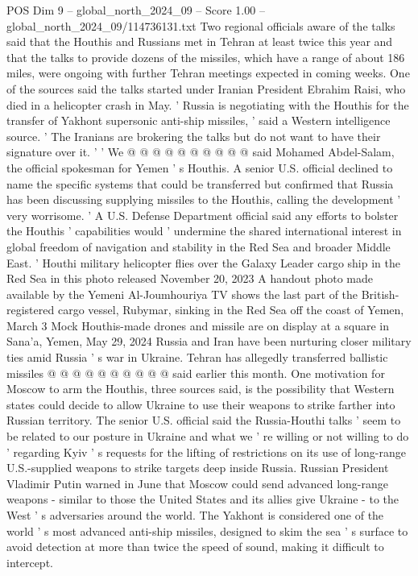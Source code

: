\begin{textsample}{POS Dim 9 – global\_north\_2024\_09 – Score 1.00 – global\_north\_2024\_09/114736131.txt}
Two regional officials aware of the talks said that the Houthis and Russians met in Tehran at least twice this year and that the talks to provide dozens of the missiles, which have a range of about 186 miles, were ongoing with further Tehran meetings expected in coming weeks.
One of the sources said the talks started under Iranian President Ebrahim Raisi, who died in a helicopter crash in May. ' Russia is negotiating with the Houthis for the transfer of Yakhont supersonic anti-ship missiles, ' said a Western intelligence source. ' The Iranians are brokering the talks but do not want to have their signature over it. ' ' We @ @ @ @ @ @ @ @ @ @ said Mohamed Abdel-Salam, the official spokesman for Yemen ' s Houthis.
A senior U.S. official declined to name the specific systems that could be transferred but confirmed that Russia has been discussing supplying missiles to the Houthis, calling the development ' very worrisome. ' A U.S.
Defense Department official said any efforts to bolster the Houthis ' capabilities would ' undermine the shared international interest in global freedom of navigation and stability in the Red Sea and broader Middle East. ' Houthi military helicopter flies over the Galaxy Leader cargo ship in the Red Sea in this photo released November 20, 2023 A handout photo made available by the Yemeni Al-Joumhouriya TV shows the last part of the British-registered cargo vessel, Rubymar, sinking in the Red Sea off the coast of Yemen, March 3 Mock Houthis-made drones and missile are on display at a square in Sana'a, Yemen, May 29, 2024 Russia and Iran have been nurturing closer military ties amid Russia ' s war in Ukraine.
Tehran has allegedly transferred ballistic missiles @ @ @ @ @ @ @ @ @ @ said earlier this month.
One motivation for Moscow to arm the Houthis, three sources said, is the possibility that Western states could decide to allow Ukraine to use their weapons to strike farther into Russian territory.
The senior U.S. official said the Russia-Houthi talks ' seem to be related to our posture in Ukraine and what we ' re willing or not willing to do ' regarding Kyiv ' s requests for the lifting of restrictions on its use of long-range U.S.-supplied weapons to strike targets deep inside Russia.
Russian President Vladimir Putin warned in June that Moscow could send advanced long-range weapons - similar to those the United States and its allies give Ukraine - to the West ' s adversaries around the world.
The Yakhont is considered one of the world ' s most advanced anti-ship missiles, designed to skim the sea ' s surface to avoid detection at more than twice the speed of sound, making it difficult to intercept.

\end{textsample}
